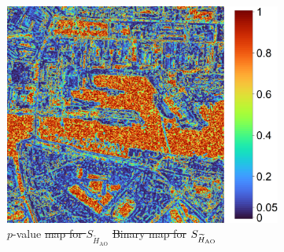 \documentclass[
  lettersize  journal,
]{IEEEtran}%
\providecommand{\DIFaddtex}[1]{{\protect\color{blue}\uwave{#1}}} %
\providecommand{\DIFdeltex}[1]{{\protect\color{red}\sout{#1}}} %
\providecommand{\DIFaddFL}[1]{\DIFadd{#1}} %
\providecommand{\DIFdelFL}[1]{\DIFdel{#1}} %
\providecommand{\DIFaddbeginFL}{} %
\providecommand{\DIFaddendFL}{} %
\providecommand{\DIFdelbeginFL}{} %
\providecommand{\DIFdelendFL}{} %
\providecommand{\DIFadd}[1]{\texorpdfstring{\DIFaddtex{#1}}{#1}} %
\providecommand{\DIFdel}[1]{\texorpdfstring{\DIFdeltex{#1}}{}} %
\newcommand{\DIFscaledelfig}{0.5}
\newlength{\DIFdelgraphicswidth} %
\newlength{\DIFdelgraphicsheight} %
\newcommand{\DIFaddincludegraphics}[2][]{{\color{blue}\fbox{\DIFOincludegraphics[#1]{#2}}}} %
\newcommand{\DIFdelincludegraphics}[2][]{%
\sbox{\DIFdelgraphicsbox}{\DIFOincludegraphics[#1]{#2}}%
\settoboxwidth{\DIFdelgraphicswidth}{\DIFdelgraphicsbox} %
\settoboxtotalheight{\DIFdelgraphicsheight}{\DIFdelgraphicsbox} %
\scalebox{\DIFscaledelfig}{%
\parbox[b]{\DIFdelgraphicswidth}{\usebox{\DIFdelgraphicsbox}\\[-\baselineskip] \rule{\DIFdelgraphicswidth}{0em}}\llap{\resizebox{\DIFdelgraphicswidth}{\DIFdelgraphicsheight}{%
\setlength{\unitlength}{\DIFdelgraphicswidth}%
\begin{picture}(1,1)%
\thicklines\linethickness{2pt} %
{\color[rgb]{1,0,0}\put(0,0){\framebox(1,1){}}}%
{\color[rgb]{1,0,0}\put(0,0){\line( 1,1){1}}}%
{\color[rgb]{1,0,0}\put(0,1){\line(1,-1){1}}}%
\end{picture}%
}\hspace*{3pt}}} %
} %
\DeclareRobustCommand{\DIFaddbeginFL}{\DIFOaddbeginFL \let\includegraphics\DIFaddincludegraphics} %
\DeclareRobustCommand{\DIFaddendFL}{\DIFOaddendFL \let\includegraphics\DIFOincludegraphics} %
\DeclareRobustCommand{\DIFdelbeginFL}{\DIFOdelbeginFL \let\includegraphics\DIFdelincludegraphics} %
\DeclareRobustCommand{\DIFdelendFL}{\DIFOaddendFL \let\includegraphics\DIFOincludegraphics} %
\begin{document}
\begin{figure}[hbt]
{    }\begin{subfigure}{0.178\textwidth}
        \includegraphics[width=\linewidth]{./Figures-R1/p-values_shannon-dublin-H1.png}
        \DIFaddendFL \caption{$p$-value \DIFdelbeginFL \DIFdelFL{map for $S_{\widetilde{H}_{\text{AO}}}$}%
\DIFdelFL{Binary map for }\DIFdelendFL $\small{S_{\widetilde{H}_{\text{AO}}}}$}
        \DIFdelbeginFL %
\DIFdelendFL \DIFaddbeginFL \label{fig:dublin-shann}
    \DIFaddendFL \end{subfigure}
    \DIFaddbeginFL \DIFaddFL{\hspace{0.0000001\textwidth}
    }\begin{subfigure}{0.144\textwidth}

\end{subfigure}
\end{figure}
\end{document}
